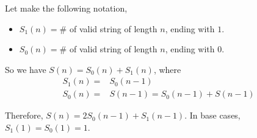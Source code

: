 Let make the following notation,
\begin{itemize}
	\item $S_1(n) = \#$ of valid string of length $n$, ending with $1$.
	\item $S_0(n) = \#$ of valid string of length $n$, ending with $0$.
\end{itemize}

So we have $S(n) = S_0(n) + S_1(n)$, where
\begin{align*}
	S_1(n) =& S_0(n-1)\\
	S_0(n) =& S(n-1) = S_0(n-1) + S(n-1) 
\end{align*}

Therefore, $S(n) = 2S_0(n - 1) + S_1(n - 1)$. In base cases, $S_1(1) = S_0(1) = 1$.

